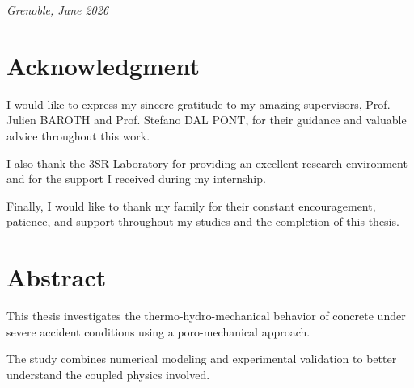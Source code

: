 \documentclass[a4paper,12pt,twoside]{report}     %
\begin{document}
\begin{titlepage}
\begin{center}
\begin{minipage}[c][0.92\textheight][t]{0.9\textwidth}
        \vspace{1.5cm}

        {\large \textit{Grenoble, June 2026}}
        \vspace{1.5cm}
        
    \end{minipage}
\end{center}   
\end{titlepage}



\thispagestyle{empty}

\cleardoublepage
{}
\pagestyle{romanstyle}


\chapter*{Acknowledgment}

I would like to express my sincere gratitude to my amazing supervisors, Prof. Julien BAROTH and Prof. Stefano DAL PONT, for their guidance and valuable advice throughout this work.

I also thank the 3SR Laboratory for providing an excellent research environment and for the support I received during my internship.

Finally, I would like to thank my family for their constant encouragement, patience, and support throughout my studies and the completion of this thesis.



\newpage
\chapter*{Abstract}

This thesis investigates the thermo-hydro-mechanical behavior of concrete
under severe accident conditions using a poro-mechanical approach.

The study combines numerical modeling and experimental validation
to better understand the coupled physics involved.



\cleardoublepage
\renewcommand{\contentsname}{Table of Contents}
\tableofcontents
\end{document}

